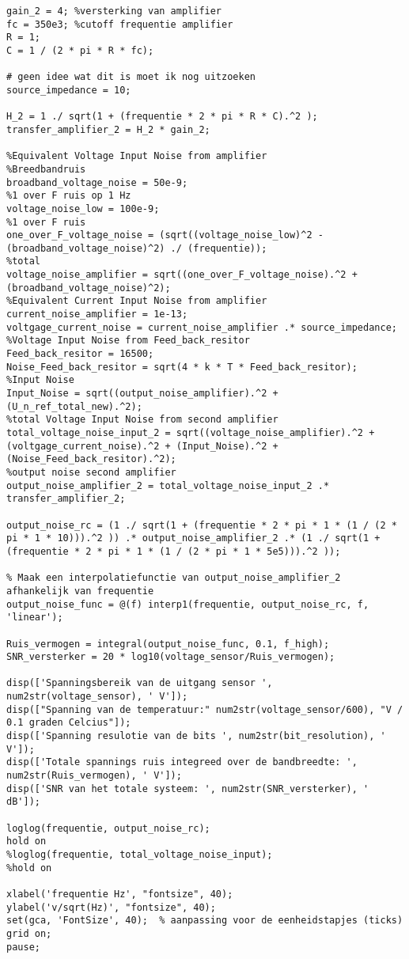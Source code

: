 \begin{lstlisting}[caption={Octave code voor de ruis berekeningen van de temperatuur sensor}, label={lst:octave_code_noise}]
%overdracht amplifier
gain_2 = 4; %versterking van amplifier
fc = 350e3; %cutoff frequentie amplifier
R = 1;
C = 1 / (2 * pi * R * fc);

# geen idee wat dit is moet ik nog uitzoeken
source_impedance = 10;

H_2 = 1 ./ sqrt(1 + (frequentie * 2 * pi * R * C).^2 );
transfer_amplifier_2 = H_2 * gain_2;

%Equivalent Voltage Input Noise from amplifier
%Breedbandruis
broadband_voltage_noise = 50e-9;
%1 over F ruis op 1 Hz
voltage_noise_low = 100e-9;
%1 over F ruis
one_over_F_voltage_noise = (sqrt((voltage_noise_low)^2 - (broadband_voltage_noise)^2) ./ (frequentie));
%total
voltage_noise_amplifier = sqrt((one_over_F_voltage_noise).^2 + (broadband_voltage_noise)^2);
%Equivalent Current Input Noise from amplifier
current_noise_amplifier = 1e-13;
voltgage_current_noise = current_noise_amplifier .* source_impedance;
%Voltage Input Noise from Feed_back_resitor
Feed_back_resitor = 16500;
Noise_Feed_back_resitor = sqrt(4 * k * T * Feed_back_resitor);
%Input Noise
Input_Noise = sqrt((output_noise_amplifier).^2 + (U_n_ref_total_new).^2);
%total Voltage Input Noise from second amplifier
total_voltage_noise_input_2 = sqrt((voltage_noise_amplifier).^2 + (voltgage_current_noise).^2 + (Input_Noise).^2 + (Noise_Feed_back_resitor).^2);
%output noise second amplifier
output_noise_amplifier_2 = total_voltage_noise_input_2 .* transfer_amplifier_2;

output_noise_rc = (1 ./ sqrt(1 + (frequentie * 2 * pi * 1 * (1 / (2 * pi * 1 * 10))).^2 )) .* output_noise_amplifier_2 .* (1 ./ sqrt(1 + (frequentie * 2 * pi * 1 * (1 / (2 * pi * 1 * 5e5))).^2 ));

% Maak een interpolatiefunctie van output_noise_amplifier_2 afhankelijk van frequentie
output_noise_func = @(f) interp1(frequentie, output_noise_rc, f, 'linear');

Ruis_vermogen = integral(output_noise_func, 0.1, f_high);
SNR_versterker = 20 * log10(voltage_sensor/Ruis_vermogen);

disp(['Spanningsbereik van de uitgang sensor ', num2str(voltage_sensor), ' V']);
disp(["Spanning van de temperatuur:" num2str(voltage_sensor/600), "V / 0.1 graden Celcius"]);
disp(['Spanning resulotie van de bits ', num2str(bit_resolution), ' V']);
disp(['Totale spannings ruis integreed over de bandbreedte: ', num2str(Ruis_vermogen), ' V']);
disp(['SNR van het totale systeem: ', num2str(SNR_versterker), ' dB']);

loglog(frequentie, output_noise_rc);
hold on
%loglog(frequentie, total_voltage_noise_input);
%hold on

xlabel('frequentie Hz', "fontsize", 40);
ylabel('v/sqrt(Hz)', "fontsize", 40);
set(gca, 'FontSize', 40);  % aanpassing voor de eenheidstapjes (ticks)
grid on;
pause;
\end{lstlisting}
\newpage
